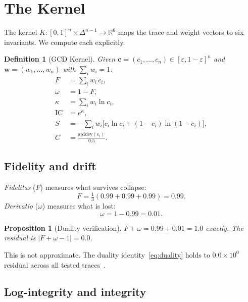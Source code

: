 \documentclass[
  aps,
  prd,
  twocolumn,
  superscriptaddress,
  nofootinbib,
  floatfix
]{revtex4-2}
\newtheorem{definition}[theorem]{Definition}
\newtheorem{proposition}[theorem]{Proposition}
\newcommand{\eps}{\varepsilon}
\newcommand{\beq}{\begin{equation}}
\newcommand{\eeq}{\end{equation}}
\newcommand{\tvec}{\mathbf{c}}
\newcommand{\wvec}{\mathbf{w}}
\newcommand{\IC}{\mathrm{IC}}
\begin{document}
\section{The Kernel}\label{sec:kernel}

The kernel $K: [0,1]^n \times \Delta^{n-1} \to \mathbb{R}^6$ maps
the trace and weight vectors to six invariants.  We compute each
explicitly.

\begin{definition}[GCD Kernel]\label{def:kernel}
Given $\tvec = (c_1, \ldots, c_n) \in [\eps, 1-\eps]^n$ and
$\wvec = (w_1, \ldots, w_n)$ with $\sum_i w_i = 1$:
\begin{align}
  F &= \sum_i w_i \, c_i, \label{eq:F} \\
  \omega &= 1 - F, \label{eq:omega} \\
  \kappa &= \sum_i w_i \ln c_i, \label{eq:kappa} \\
  \IC &= e^\kappa, \label{eq:IC} \\
  S &= -\sum_i w_i \bigl[c_i \ln c_i + (1{-}c_i)\ln(1{-}c_i)\bigr],
    \label{eq:S} \\
  C &= \frac{\mathrm{stddev}(c_i)}{0.5}. \label{eq:C}
\end{align}
\end{definition}

\subsection{Fidelity and drift}

\emph{Fidelitas} ($F$) measures what survives collapse:
\beq
  F = \tfrac{1}{3}(0.99 + 0.99 + 0.99) = 0.99.
\eeq
\emph{Derivatio} ($\omega$) measures what is lost:
\beq
  \omega = 1 - 0.99 = 0.01.
\eeq

\begin{proposition}[Duality verification]\label{prop:duality}
$F + \omega = 0.99 + 0.01 = 1.0$ exactly.  The residual is
$|F + \omega - 1| = 0.0$.
\end{proposition}

This is not approximate.  The duality identity~\eqref{eq:duality}
holds to $0.0 \times 10^0$ residual across all tested
traces~\cite{umcpmetadatarepo}.

\subsection{Log-integrity and integrity}
\end{document}
